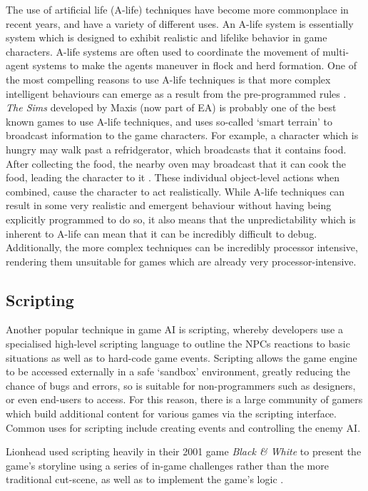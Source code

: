 \documentclass[a4paper,oneside]{report}
\begin{document}
The use of artificial life (A-life) techniques have become more commonplace in recent years, and have a variety of different uses. An A-life system is essentially system which is designed to exhibit realistic and lifelike behavior in game characters. A-life systems are often used to coordinate the movement of multi-agent systems to make the agents maneuver in flock and herd formation. One of the most compelling reasons to use A-life techniques is that more complex intelligent behaviours can emerge as a result from the pre-programmed rules \cite{Woodcock:bs}. \emph{The Sims} developed by Maxis (now part of EA) is probably one of the best known games to use A-life techniques, and uses so-called `smart terrain' to broadcast information to the game characters. For example,  a character which is hungry may walk past a refridgerator, which broadcasts that it contains food. After collecting the food, the nearby oven may broadcast that it can cook the food, leading the character to it \cite{Woodcock:bs}. These individual object-level actions when combined, cause the character to act realistically. While A-life techniques can result in some very realistic and emergent behaviour without having being explicitly programmed to do so, it also means that the unpredictability which is inherent to A-life can mean that it can be incredibly difficult to debug. Additionally, the more complex techniques can be incredibly processor intensive, rendering them unsuitable for games which are already very processor-intensive. 

\subsection{Scripting} 

Another popular technique in game AI is scripting, whereby developers use a specialised high-level scripting language to outline the NPCs reactions to basic situations as well as to hard-code game events. Scripting allows the game engine to be accessed externally in a safe `sandbox' environment, greatly reducing the chance of bugs and errors, so is suitable for non-programmers such as designers, or even end-users to access. For this reason, there is a large community of gamers which build additional content for various games via the scripting interface. Common uses for scripting include creating events and controlling the enemy AI. 

Lionhead used scripting heavily in their 2001 game \emph{Black \& White} to present the game's storyline using a series of in-game challenges rather than the more traditional cut-scene, as well as to implement the game's logic \cite{:hc}. 
\end{document}
